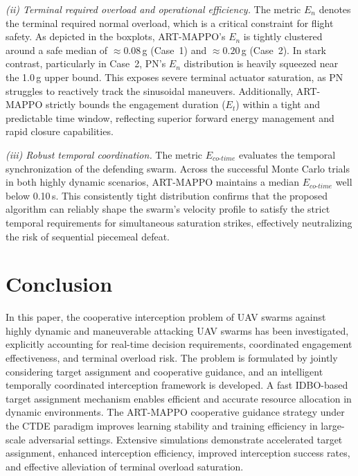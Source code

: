 \documentclass[lettersize,journal]{IEEEtran}
\providecommand{\DIFadd}[1]{{\protect\color{blue}\uwave{#1}}} %
\providecommand{\DIFaddbegin}{} %
\providecommand{\DIFaddend}{} %
\newcommand{\DIFaddincludegraphics}[2][]{{\color{blue}\fbox{\DIFOincludegraphics[#1]{#2}}}} %
\DeclareRobustCommand{\DIFaddbegin}{\DIFOaddbegin \let\includegraphics\DIFaddincludegraphics} %
\DeclareRobustCommand{\DIFaddend}{\DIFOaddend \let\includegraphics\DIFOincludegraphics} %
\begin{document}
\emph{(ii) Terminal required overload and operational efficiency.} The metric $E_n$ denotes the terminal required normal overload, which is a critical constraint for flight safety. As depicted in the boxplots, ART-MAPPO's $E_n$ is tightly clustered around a safe median of $\approx0.08$\,g (Case~1) and $\approx0.20$\,g (Case~2). In stark contrast, particularly in Case~2, PN's $E_n$ distribution is heavily squeezed near the 1.0\,g upper bound. This exposes severe terminal actuator saturation, as PN struggles to reactively track the sinusoidal maneuvers. Additionally, ART-MAPPO strictly bounds the engagement duration ($E_t$) within a tight and predictable time window, reflecting superior forward energy management and rapid closure capabilities.

\emph{(iii) Robust temporal coordination.} The metric $E_{co\text{-}time}$ evaluates the temporal synchronization of the defending swarm. Across the successful Monte Carlo trials in both highly dynamic scenarios, ART-MAPPO maintains a median $E_{co\text{-}time}$ well below 0.10\,s. This consistently tight distribution confirms that the proposed algorithm can reliably shape the swarm's velocity profile to satisfy the strict temporal requirements for simultaneous saturation strikes, effectively neutralizing the risk of sequential piecemeal defeat.



\section{Conclusion}
\label{sec:conclusion}

In this paper, the cooperative interception problem of UAV swarms against highly dynamic and
maneuverable attacking UAV swarms has been investigated, explicitly accounting for real-time
decision requirements, coordinated engagement effectiveness, and terminal overload risk.
The problem is formulated by jointly considering target assignment and cooperative guidance,
and an intelligent temporally coordinated interception framework is developed.
A fast IDBO-based target assignment mechanism enables efficient and accurate resource
allocation in dynamic environments.
The ART-MAPPO cooperative guidance strategy under the CTDE paradigm improves learning
stability and training efficiency in large-scale adversarial settings.
Extensive \DIFaddbegin \DIFadd{three-dimensional }\DIFaddend simulations demonstrate accelerated target assignment, enhanced interception
efficiency, improved interception success rates, and effective alleviation of terminal overload
saturation.
\end{document}
